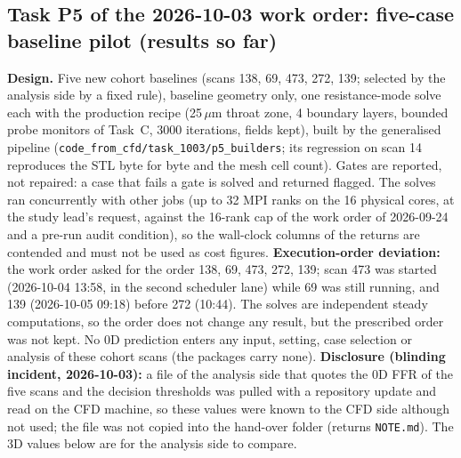 \documentclass[11pt]{article}
\begin{document}
\subsection{Task P5 of the 2026-10-03 work order: five-case baseline pilot (results so far)}
\label{sec:p5}
\textbf{Design.} Five new cohort baselines (scans 138, 69, 473, 272, 139; selected by the analysis side by a fixed rule), baseline geometry only, one resistance-mode solve each with the production recipe (25\,$\mu$m throat zone, 4 boundary layers, bounded probe monitors of Task~C, 3000 iterations, fields kept), built by the generalised pipeline (\texttt{code\_\allowbreak{}from\_\allowbreak{}cfd/\allowbreak{}task\_\allowbreak{}1003/\allowbreak{}p5\_\allowbreak{}builders}; its regression on scan 14 reproduces the STL byte for byte and the mesh cell count). Gates are reported, not repaired: a case that fails a gate is solved and returned flagged. The solves ran concurrently with other jobs (up to 32 MPI ranks on the 16 physical cores, at the study lead's request, against the 16-rank cap of the work order of 2026-09-24 and a pre-run audit condition), so the wall-clock columns of the returns are contended and must not be used as cost figures. \textbf{Execution-order deviation:} the work order asked for the order 138, 69, 473, 272, 139; scan 473 was started (2026-10-04 13:58, in the second scheduler lane) while 69 was still running, and 139 (2026-10-05 09:18) before 272 (10:44). The solves are independent steady computations, so the order does not change any result, but the prescribed order was not kept. No 0D prediction enters any input, setting, case selection or analysis of these cohort scans (the packages carry none). \textbf{Disclosure (blinding incident, 2026-10-03):} a file of the analysis side that quotes the 0D FFR of the five scans and the decision thresholds was pulled with a repository update and read on the CFD machine, so these values were known to the CFD side although not used; the file was not copied into the hand-over folder (returns \texttt{NOTE.md}). The 3D values below are for the analysis side to compare.
\end{document}

